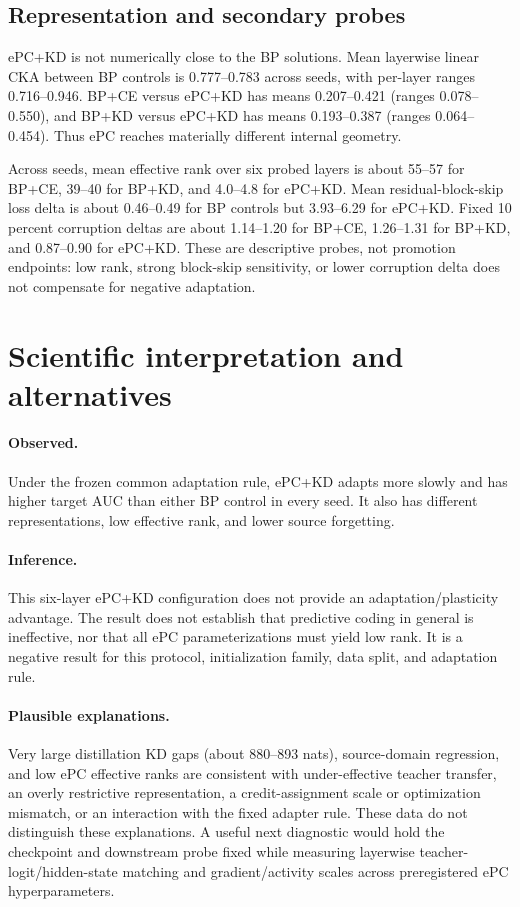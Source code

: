 \documentclass[11pt]{article}
\begin{document}
\subsection{Representation and secondary probes}
ePC+KD is not numerically close to the BP solutions. Mean layerwise linear CKA between BP controls is 0.777--0.783 across seeds, with per-layer ranges 0.716--0.946. BP+CE versus ePC+KD has means 0.207--0.421 (ranges 0.078--0.550), and BP+KD versus ePC+KD has means 0.193--0.387 (ranges 0.064--0.454). Thus ePC reaches materially different internal geometry.

Across seeds, mean effective rank over six probed layers is about 55--57 for BP+CE, 39--40 for BP+KD, and 4.0--4.8 for ePC+KD. Mean residual-block-skip loss delta is about 0.46--0.49 for BP controls but 3.93--6.29 for ePC+KD. Fixed 10 percent corruption deltas are about 1.14--1.20 for BP+CE, 1.26--1.31 for BP+KD, and 0.87--0.90 for ePC+KD. These are descriptive probes, not promotion endpoints: low rank, strong block-skip sensitivity, or lower corruption delta does not compensate for negative adaptation.

\section{Scientific interpretation and alternatives}
\paragraph{Observed.} Under the frozen common adaptation rule, ePC+KD adapts more slowly and has higher target AUC than either BP control in every seed. It also has different representations, low effective rank, and lower source forgetting.

\paragraph{Inference.} This six-layer ePC+KD configuration does not provide an adaptation/plasticity advantage. The result does not establish that predictive coding in general is ineffective, nor that all ePC parameterizations must yield low rank. It is a negative result for this protocol, initialization family, data split, and adaptation rule.

\paragraph{Plausible explanations.} Very large distillation KD gaps (about 880--893 nats), source-domain regression, and low ePC effective ranks are consistent with under-effective teacher transfer, an overly restrictive representation, a credit-assignment scale or optimization mismatch, or an interaction with the fixed adapter rule. These data do not distinguish these explanations. A useful next diagnostic would hold the checkpoint and downstream probe fixed while measuring layerwise teacher-logit/hidden-state matching and gradient/activity scales across preregistered ePC hyperparameters.
\end{document}
